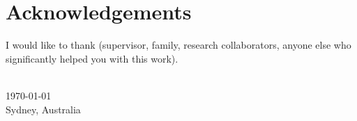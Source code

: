 \chapter*{Acknowledgements}

I would like to thank (supervisor, family, research collaborators, anyone else who significantly helped you with this work).

{
\makeatletter
\vspace{1cm}
\raggedleft
\@author{}\\
\today{}\\
Sydney, Australia\\
\raggedright
\makeatother
}
